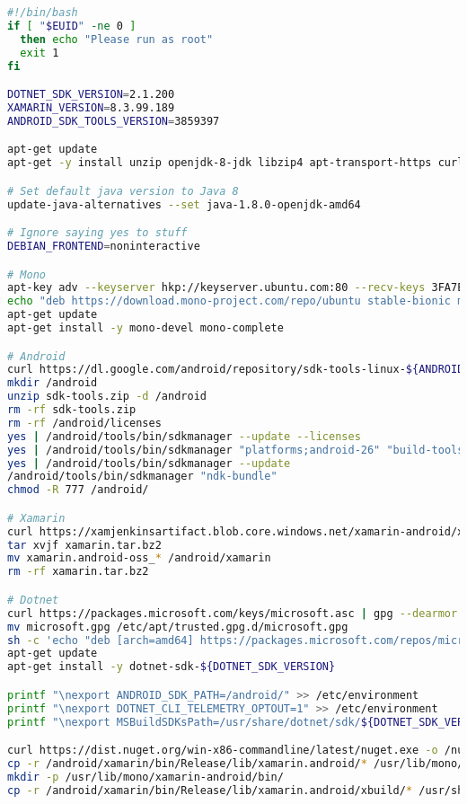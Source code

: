 \begin{lstlisting}[language=bash]
#!/bin/bash
if [ "$EUID" -ne 0 ]
  then echo "Please run as root"
  exit 1
fi

DOTNET_SDK_VERSION=2.1.200
XAMARIN_VERSION=8.3.99.189
ANDROID_SDK_TOOLS_VERSION=3859397

apt-get update
apt-get -y install unzip openjdk-8-jdk libzip4 apt-transport-https curl gnupg

# Set default java version to Java 8
update-java-alternatives --set java-1.8.0-openjdk-amd64

# Ignore saying yes to stuff
DEBIAN_FRONTEND=noninteractive

# Mono
apt-key adv --keyserver hkp://keyserver.ubuntu.com:80 --recv-keys 3FA7E0328081BFF6A14DA29AA6A19B38D3D831EF
echo "deb https://download.mono-project.com/repo/ubuntu stable-bionic main" | tee /etc/apt/sources.list.d/mono-official-stable.list
apt-get update
apt-get install -y mono-devel mono-complete

# Android
curl https://dl.google.com/android/repository/sdk-tools-linux-${ANDROID_SDK_TOOLS_VERSION}.zip -o sdk-tools.zip
mkdir /android
unzip sdk-tools.zip -d /android
rm -rf sdk-tools.zip
rm -rf /android/licenses
yes | /android/tools/bin/sdkmanager --update --licenses
yes | /android/tools/bin/sdkmanager "platforms;android-26" "build-tools;27.0.3"
yes | /android/tools/bin/sdkmanager --update
/android/tools/bin/sdkmanager "ndk-bundle"
chmod -R 777 /android/

# Xamarin
curl https://xamjenkinsartifact.blob.core.windows.net/xamarin-android/xamarin-android/xamarin.android-oss_${XAMARIN_VERSION}.orig.tar.bz2 -o xamarin.tar.bz2
tar xvjf xamarin.tar.bz2
mv xamarin.android-oss_* /android/xamarin
rm -rf xamarin.tar.bz2

# Dotnet
curl https://packages.microsoft.com/keys/microsoft.asc | gpg --dearmor > microsoft.gpg
mv microsoft.gpg /etc/apt/trusted.gpg.d/microsoft.gpg
sh -c 'echo "deb [arch=amd64] https://packages.microsoft.com/repos/microsoft-ubuntu-bionic-prod bionic main" > /etc/apt/sources.list.d/dotnetdev.list'
apt-get update
apt-get install -y dotnet-sdk-${DOTNET_SDK_VERSION}

printf "\nexport ANDROID_SDK_PATH=/android/" >> /etc/environment
printf "\nexport DOTNET_CLI_TELEMETRY_OPTOUT=1" >> /etc/environment
printf "\nexport MSBuildSDKsPath=/usr/share/dotnet/sdk/${DOTNET_SDK_VERSION}" >> /etc/environment

curl https://dist.nuget.org/win-x86-commandline/latest/nuget.exe -o /nuget.exe
cp -r /android/xamarin/bin/Release/lib/xamarin.android/* /usr/lib/mono/
mkdir -p /usr/lib/mono/xamarin-android/bin/
cp -r /android/xamarin/bin/Release/lib/xamarin.android/xbuild/* /usr/share/dotnet/sdk/${DOTNET_SDK_VERSION}
\end{lstlisting}

